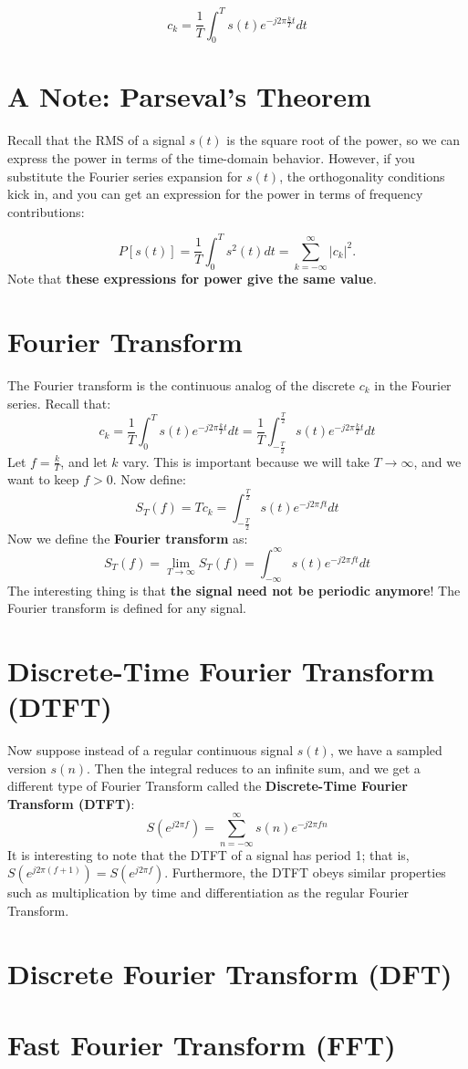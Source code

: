 \documentclass[11pt]{article}
\newcommand{\abs}[1]{\lvert #1 \rvert}
\begin{document}
\[c_k = \frac{1}{T} \int_0^T s(t) e^{-j 2 \pi \frac{k}{T} t} dt\]

\section*{A Note: Parseval's Theorem}
Recall that the RMS of a signal $s(t)$ is the square root of the power, so we can express the power in terms of the time-domain behavior. However, if you substitute the Fourier series expansion for $s(t)$, the orthogonality conditions kick in, and you can get an expression for the power in terms of frequency contributions: 

\[P[s(t)] = \frac{1}{T} \int_0^T s^2(t) dt =  \sum_{k=-\infty}^{\infty} \abs{c_k}^2. \]
Note that {\bf these expressions for power give the same value}.

\section*{Fourier Transform}
The Fourier transform is the continuous analog of the discrete $c_k$ in the Fourier series. Recall that:
\[ c_k = \frac{1}{T} \int_0^T s(t) e^{-j 2 \pi \frac{k}{T} t} dt = \frac{1}{T} \int_{-\frac{T}{2}}^{\frac{T}{2}} s(t) e^{-j 2 \pi \frac{k}{T} t} dt \]
Let $f=\frac{k}{T}$, and let $k$ vary. This is important because we will take $T \to \infty$, and we want to keep $f >0$.  Now define:
\[ S_T(f) = T c_k = \int_{-\frac{T}{2}}^{\frac{T}{2}} s(t) e^{-j 2 \pi f t} dt \]
Now we define the {\bf Fourier transform} as: 
\[ S_T(f) = \lim_{T \to \infty} S_T(f) = \int_{-\infty}^{\infty} s(t) e^{-j 2 \pi f t} dt \]
The interesting thing is that {\bf the signal need not be periodic anymore}! The Fourier transform is defined for any signal.

\section*{Discrete-Time Fourier Transform (DTFT)}
Now suppose instead of a regular continuous signal $s(t)$, we have a sampled version $s(n)$. Then the integral reduces to an infinite sum, and we get a different type of Fourier Transform called the {\bf Discrete-Time Fourier Transform (DTFT)}:
\[ S(e^{j2\pi f}) = \sum_{n=-\infty}^{\infty} s(n)e^{-j2\pi fn}\]
It is interesting to note that the DTFT of a signal has period 1; that is, $S(e^{j2\pi (f+1)}) = S(e^{j2\pi f})$. Furthermore, the DTFT obeys similar properties such as multiplication by time and differentiation as the regular Fourier Transform.

\section*{Discrete Fourier Transform (DFT)}


\section*{Fast Fourier Transform (FFT)}
\end{document}
